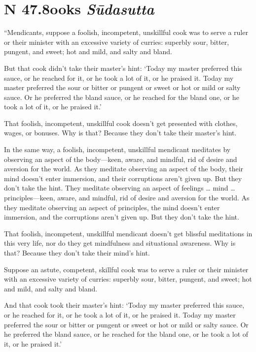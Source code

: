 \documentclass[12pt,openany]{book}%
\newcommand*{\suttatitleacronym}[1]{\smaller[2]{#1}\vspace*{.3em}}
\newcommand*{\suttatitletranslation}[1]{\linebreak{#1}}
\newcommand*{\suttatitleroot}[1]{\linebreak\smaller[2]\itshape{#1}}
\newcommand*{\tocacronym}[1]{\hspace*{-3.3em}{#1}\quad}
\newcommand*{\toctranslation}[1]{#1}
\newcommand*{\tocroot}[1]{(\textit{#1})}
\begin{document}
%
\section*{{\suttatitleacronym SN 47.8}{\suttatitletranslation Cooks }{\suttatitleroot Sūdasutta}}
\addcontentsline{toc}{section}{\tocacronym{SN 47.8} \toctranslation{Cooks } \tocroot{Sūdasutta}}

“Mendicants, suppose a foolish, incompetent, unskillful cook was to serve a ruler or their minister with an excessive variety of curries: superbly sour, bitter, pungent, and sweet; hot and mild, and salty and bland. 

But that cook didn’t take their master’s hint: ‘Today my master preferred this sauce, or he reached for it, or he took a lot of it, or he praised it. Today my master preferred the sour or bitter or pungent or sweet or hot or mild or salty sauce. Or he preferred the bland sauce, or he reached for the bland one, or he took a lot of it, or he praised it.’ 

That foolish, incompetent, unskillful cook doesn’t get presented with clothes, wages, or bonuses. Why is that? Because they don’t take their master’s hint. 

In the same way, a foolish, incompetent, unskillful mendicant meditates by observing an aspect of the body—keen, aware, and mindful, rid of desire and aversion for the world. As they meditate observing an aspect of the body, their mind doesn’t enter immersion, and their corruptions aren’t given up. But they don’t take the hint. They meditate observing an aspect of feelings … mind … principles—keen, aware, and mindful, rid of desire and aversion for the world. As they meditate observing an aspect of principles, the mind doesn’t enter immersion, and the corruptions aren’t given up. But they don’t take the hint. 

That foolish, incompetent, unskillful mendicant doesn’t get blissful meditations in this very life, nor do they get mindfulness and situational awareness. Why is that? Because they don’t take their mind’s hint. 

Suppose an astute, competent, skillful cook was to serve a ruler or their minister with an excessive variety of curries: superbly sour, bitter, pungent, and sweet; hot and mild, and salty and bland. 

And that cook took their master’s hint: ‘Today my master preferred this sauce, or he reached for it, or he took a lot of it, or he praised it. Today my master preferred the sour or bitter or pungent or sweet or hot or mild or salty sauce. Or he preferred the bland sauce, or he reached for the bland one, or he took a lot of it, or he praised it.’ 
\end{document}
